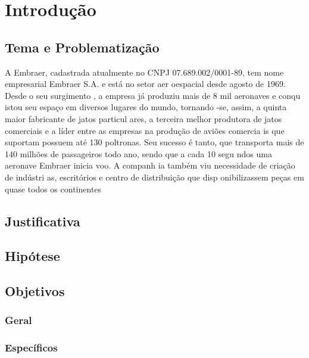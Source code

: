 
\chapter{Introdução}

\section{Tema e Problematização}
A Embraer,
cadastrada atualmente no CNPJ 07.689.002/0001-89,
tem nome empresarial Embraer S.A. e está no setor aer
oespacial desde agosto de 1969. Desde o seu surgimento
, a empresa já produziu mais de 8 mil aeronaves e conqu
istou seu espaço em diversos lugares do mundo, tornando
-se, assim, a quinta maior fabricante de jatos particul
ares, a terceira melhor produtora de jatos comerciais e 
a líder entre as empresas na produção de aviões comercia
is que suportam possuem até 130 poltronas. Seu sucesso é
tanto, que transporta mais de 140 milhões de 
passageiros todo ano, sendo que a cada 10 segu
ndos uma aeronave Embraer inicia voo. A companh
ia também viu necessidade de criação de indústri
as, escritórios e centro de distribuição que disp
onibilizassem peças em quase todos os continentes

\section{Justificativa}
\lipsum[1]

\section{Hipótese}
\lipsum[1]

\section{Objetivos}
\subsection{Geral}
\subsection{Específicos}
\lipsum[1]




